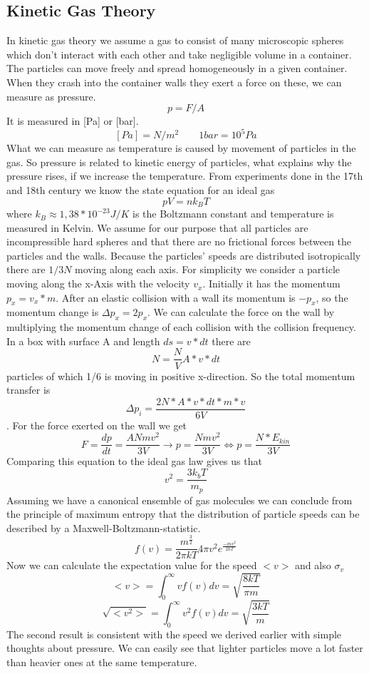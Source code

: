 \documentclass[]{article}
\begin{document}
\subsection{Kinetic Gas Theory}
In kinetic gas theory we assume a gas to consist of many microscopic spheres which don't interact with each other and take negligible volume in a container. The particles can move freely and spread homogeneously in a given container. When they crash into the container walls they exert a force on these, we can measure as pressure. 
\[ p=F/A \]
It is measured in [Pa] or [bar].
\[ [Pa]=N/m^{2}     \qquad  1bar=10^{5}Pa		 \]
What we can measure as temperature is caused by movement of particles in the gas. So pressure is related to kinetic energy of particles, what explains why the pressure rises, if we increase the temperature. From experiments done in the 17th and 18th century we know the state equation for an ideal gas
\[ pV=nk_{B} T\]
 where $k_{B}\approx1,38*10^{-23}J/K$ is the Boltzmann constant and temperature is measured in Kelvin. We assume for our purpose that all particles are incompressible hard spheres and that there are no frictional forces between the particles and the walls. Because the particles' speeds are distributed isotropically there are $1/3N$ moving along each axis. For simplicity we consider a particle moving along the x-Axis with the velocity $v_{x}$. Initially it has the momentum $p_{x}=v_{x}*m$. After an elastic collision with a wall its momentum is $-p_{x}$, so the momentum change is $\Delta p_{x}=2p_{x}$. We can calculate the force on the wall by multiplying the momentum change of each collision with the collision frequency. In a box with surface A and length $ds=v*dt$ there are \[ N=\frac{N}{V}A *v* dt \] particles of which 1/6 is moving in positive x-direction. So the total momentum transfer is \[ \Delta p_{i}=\frac{2N* A* v* dt*m* v}{6V} \]. For the force exerted on the wall we get \[ F=\frac{dp}{dt}=\frac{ANmv^{2}}{3V} \rightarrow p=\frac{Nmv^{2}}{3V} \Leftrightarrow p=\frac{N*E_{kin}}{3V}\] Comparing this equation to the ideal gas law gives us that \[ v^{2}=\frac{3k_{b}T}{m_{p}} \] 
 Assuming we have a canonical ensemble of gas molecules we can conclude from the principle of maximum entropy that the distribution of particle speeds can be described by a Maxwell-Boltzmann-statistic. \[ f(v)=\frac{m^{\frac{3}{2}}}{2\pi k T} 4\pi v^{2} e^{\frac{-mv^{2}}{2kT}} \] Now we can calculate the expectation value for the speed $<v>$ and also $\sigma_{v}$
 \[<v>=\int_{0}^{\infty}vf(v)dv=\sqrt{\frac{8kT}{\pi m}}  \]
 \[ \sqrt{<v^{2}>}=\int_{0}^{\infty}v^{2}f(v)dv=\sqrt{\frac{3kT}{ m}}  \]
 The second result is consistent with the speed we derived earlier with simple thoughts about pressure. We can easily see that lighter particles move a lot faster than heavier ones at the same temperature. 
\end{document}
